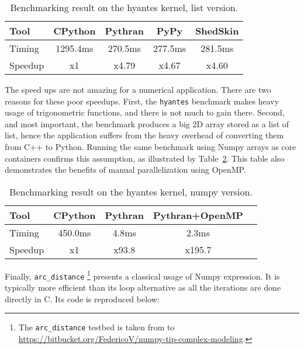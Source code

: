\documentclass[10pt, onecolumn, preprint]{sigplanconf}
\begin{document}
\begin{table}
    \centering

    \begin{tabular}{|l|c|c|c|c|}

        \hline
     Tool    &  CPython    &   Pythran     &     PyPy   &  ShedSkin  \\
    \hline
     Timing  &  1295.4ms   &   270.5ms     &    277.5ms &  281.5ms   \\
    \hline
     Speedup &  x1         &    x4.79      &    x4.67   &  x4.60     \\
    \hline
\end{tabular}
\caption{Benchmarking result on the hyantes kernel, list version.}
\label{tbl:hyantes}

\end{table}

The speed ups are not amazing %
for a numerical application. There are two
reasons for these poor speedups. First, the \texttt{hyantes} benchmark makes heavy
usage of trigonometric functions, and there is not much to gain there. Second, and
most important, the benchmark produces a big 2D array stored as a list of list,
hence the application suffers from the heavy overhead of converting them from C++
to Python. Running the same benchmark using Numpy arrays as core containers
confirms this assumption, as illustrated by Table~\ref{tbl:np-hyantes}. This
table also demonstrates the benefits of manual parallelization using OpenMP.


\begin{table}
    \centering

    \begin{tabular}{|l|c|c|c|c|}

        \hline
     Tool    &  CPython    &   Pythran     & Pythran+OpenMP   \\
    \hline
     Timing  &  450.0ms    &   4.8ms       &      2.3ms       \\
    \hline
     Speedup &  x1         &    x93.8      &    x195.7        \\
    \hline
\end{tabular}
\caption{Benchmarking result on the hyantes kernel, numpy version.}
\label{tbl:np-hyantes}
\end{table}

Finally, \texttt{arc\_distance} \footnote{The \texttt{arc\_distance} testbed is taken from to \url{https://bitbucket.org/FedericoV/numpy-tip-complex-modeling}.} presents a classical usage of Numpy expression. It
is typically more efficient than its loop alternative as all the iterations are
done directly in C. Its code is reproduced below:
\end{document}
